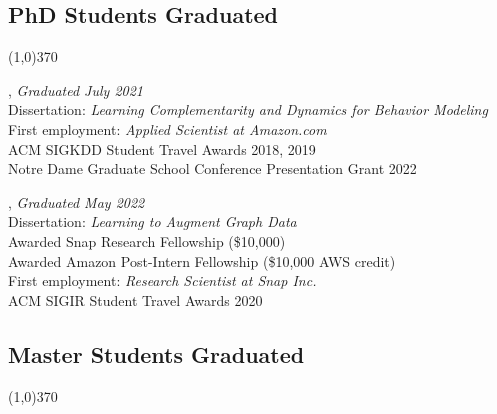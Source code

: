 \documentclass[10pt]{article}
\newenvironment{myindentpar}[1]%
{\begin{list}{}%
         {\setlength{\leftmargin}{#1}}%
         \item[]%
}
{\end{list}}
\newcounter{list}
\begin{document}
\subsection{\sc PhD Students Graduated}
\vspace{-0.4cm} \line(1,0){370} \vspace{-0.1cm}

\begin{myindentpar}{0.75cm}

\hspace{-0.75cm}{\bf Daheng Wang}, \textit{Graduated July 2021} \\
	{Dissertation: \textit{Learning Complementarity and Dynamics for Behavior Modeling}} \\
	{First employment: \textit{Applied Scientist at Amazon.com}} \\
	{ACM SIGKDD Student Travel Awards 2018, 2019} \\
	{Notre Dame Graduate School Conference Presentation Grant 2022}

\hspace{-0.75cm}{\bf Tong Zhao}, \textit{Graduated May 2022} \\
	{Dissertation: \textit{Learning to Augment Graph Data}} \\
	{Awarded Snap Research Fellowship (\$10,000)} \\
	{Awarded Amazon Post-Intern Fellowship (\$10,000 AWS credit)} \\
	{First employment: \textit{Research Scientist at Snap Inc.}} \\
	{ACM SIGIR Student Travel Awards 2020}

\end{myindentpar}
	
\subsection{\sc Master Students Graduated}
\vspace{-0.4cm} \line(1,0){370} \vspace{-0.1cm}
\end{document}
